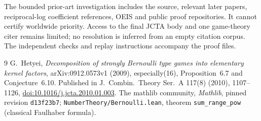 \documentclass[11pt]{article}
\begin{document}
The bounded prior-art investigation includes the source, relevant later
papers, reciprocal-log coefficient references, OEIS and public proof
repositories. It cannot certify worldwide priority. Access to the final
JCTA body and one game-theory citer remains limited; no resolution is
inferred from an empty citation corpus. The independent checks and replay instructions accompany the proof files.

\begin{thebibliography}{9}
 G.~Hetyei, \emph{Decomposition of strongly Bernoulli type games
into elementary kernel factors}, arXiv:0912.0573v1 (2009), especially(16),
Proposition~6.7 and Conjecture~6.10. Published in J.~Combin.~Theory Ser.~A
117(8) (2010), 1107--1126, \href{https://doi.org/10.1016/j.jcta.2010.01.003}{doi:10.1016/j.jcta.2010.01.003}.
 The mathlib community, \emph{Mathlib}, pinned revision
\texttt{d13f23b7}; \texttt{NumberTheory/Bernoulli.lean},
theorem \texttt{sum\_range\_pow} (classical Faulhaber formula).
\end{thebibliography}
\end{document}
